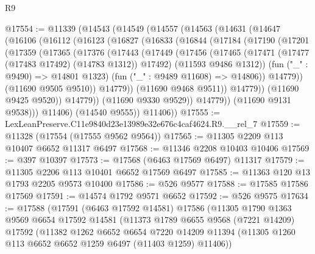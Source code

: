 \begin{lexlean}{R9}
\begin{coremodule}
@17554 := @11339
    (@14543
      (@14549
        (@14557
          (@14563
            (@14631
              (@14647
                (@16106
                  (@16112
                    (@16123
                      (@16827
                        (@16833
                          (@16844
                            (@17184
                              (@17190
                                (@17201
                                  (@17359
                                    (@17365
                                      (@17376
                                        (@17443
                                          (@17449
                                            (@17456
                                              (@17465
                                                (@17471
                                                  (@17477 (@17483 @17492) (@14783 @1312))
                                                  @17492)
                                                (@11593 @9486 @1312))
                                              (fun ("_" : @9490) => @14801 @1323)
                                              (fun ("_" : @9489 @11608) => @14806))
                                            @14779))
                                        (@11690 @9505 @9510))
                                      @14779))
                                  (@11690 @9468 @9511))
                                @14779))
                            (@11690 @9425 @9520))
                          @14779))
                      (@11690 @9330 @9529))
                    @14779))
                (@11690 @9131 @9538)))
            @11406)
          (@14540 @9555))
        @11406))
@17555 := LexLeanPreserve.C11e9840d23e13989e32e676c4caf4624.R9.__rel_7
@17559 := @11328 (@17554 (@17555 @9562 @9564))
@17565 := @11305 @2209 @113 @10407 @6652 @11317 @6497
@17568 := @11346 @2208 @10403 @10406
@17569 := @397 @10397
@17573 := @17568 (@6463 @17569 @6497) @11317
@17579 := @11305 @2206 @113 @10401 @6652 @17569 @6497
@17585 := @11363 @120 @13 @1793 @2205 @9573 @10400
@17586 := @526 @9577
@17588 := @17585 @17586 @17569
@17591 := @14574 @1792 @9571 @6652
@17592 := @526 @9575
@17634 := @17588
    (@17591
      (@6463 @17592 @14581)
      @17586
      (@11305
        @1790
        @1363
        @9569
        @6654
        @17592
        @14581
        (@11373
          @1789
          @6655
          @9568
          (@7221 @14209)
          @17592
          (@11382
            @1262
            @6652
            @6654
            @7220
            @14209
            @11394
            (@11305 @1260 @113 @6652 @6652 @1259 @6497 (@11403 @1259) @11406))

\end{coremodule}
\end{lexlean}

